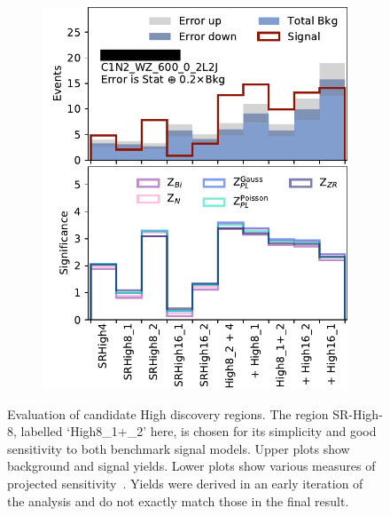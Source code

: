 \begin{figure}[tp]
\begin{subfigure}{0.48\textwidth}
\includegraphics[width=\textwidth]{figures/2ljets_disco_High_C1N2_WZ_600_0_2L2J.png}
\caption{}
\end{subfigure}
\caption[
Evaluation of candidate High discovery regions
]{%
Evaluation of candidate High discovery regions.
The region SR-High-8, labelled `High8\_1+\_2' here, is chosen for its
simplicity and good sensitivity to both benchmark signal models.
Upper plots show background and signal yields.
Lower plots show various measures of projected
sensitivity~\cite{cousins2008evaluation}.
Yields were derived in an early iteration of the analysis and do not exactly
match those in the final result.
}
\label{fig:2ljets_disco_trials_high}
\end{figure}

